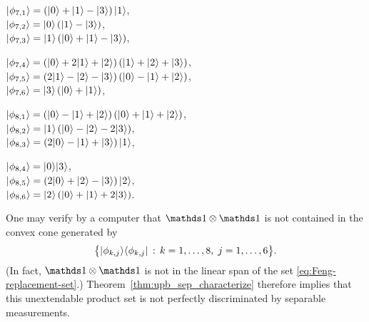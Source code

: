 \begin{example}
\vspace{2mm}

\noindent\hspace{8pt}
\begin{minipage}{0.48\textwidth}
  $\ket{\phi_{7,1}} = \left(\ket{0} + \ket{1} - \ket{3}\right)\ket{1}$,\\
  $\ket{\phi_{7,2}} = \ket{0}\left(\ket{1} - \ket{3}\right)$,\\
  $\ket{\phi_{7,3}} =  \ket{1}\left(\ket{0} + \ket{1} - \ket{3}\right)$,
\end{minipage}\hfill
\begin{minipage}{0.48\textwidth}
  $\ket{\phi_{7,4}} = \left(\ket{0} + 2\ket{1} + \ket{2}\right)
  \left(\ket{1} + \ket{2} + \ket{3}\right)$, \\
  $\ket{\phi_{7,5}} = \left(2\ket{1} - \ket{2} - \ket{3}\right)
  \left(\ket{0} - \ket{1} + \ket{2}\right)$, \\
  $\ket{\phi_{7,6}} = \ket{3}\left(\ket{0} + \ket{1}\right)$,
\end{minipage}

\vspace{2mm}

\noindent\hspace{8pt}
\begin{minipage}{0.48\textwidth}
  $\ket{\phi_{8,1}} = \left(\ket{0} - \ket{1} + \ket{2}\right)
  \left(\ket{0} + \ket{1} + \ket{2}\right)$,\\
  $\ket{\phi_{8,2}} = \ket{1}\left(\ket{0} - \ket{2} - 2\ket{3}\right)$,\\
  $\ket{\phi_{8,3}} =  \left(2\ket{0} - \ket{1} + \ket{3}\right)\ket{1}$,
\end{minipage}\hfill
\begin{minipage}{0.48\textwidth}
  $\ket{\phi_{8,4}} = \ket{0}\ket{3}$, \\
  $\ket{\phi_{8,5}} = \left(2\ket{0} + \ket{2} - \ket{3}\right)\ket{2}$, \\
  $\ket{\phi_{8,6}} = \ket{2}\left(\ket{0} + \ket{1} + 2\ket{3}\right)$.
\end{minipage}

\vspace{3mm}

\noindent 
One may verify by a computer that $\I\otimes\I$ is not contained in the convex
cone generated by 
\begin{equation}
  \label{eq:Feng-replacement-set}
  \bigl\{ \ket{\phi_{k,j}}\bra{\phi_{k,j}}\,:\,k = 1,\ldots,8,\;j=1,\ldots,6
  \bigr\}.
\end{equation}
(In fact, $\I\otimes\I$ is not in the linear span of the set
\eqref{eq:Feng-replacement-set}.)
Theorem~\ref{thm:upb_sep_characterize} therefore implies that this unextendable
product set is not perfectly discriminated by separable measurements.
\end{example}

